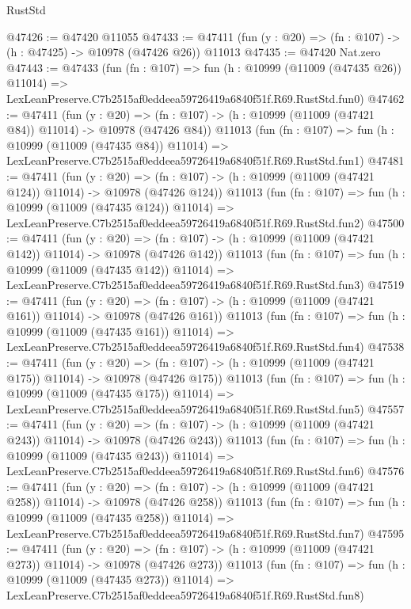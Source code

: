 \begin{lexlean}{RustStd}
\begin{coremodule}
@47426 := @47420 @11055
@47433 := @47411 (fun (y : @20) => (fn : @107) -> (h : @47425) -> @10978 (@47426 @26)) @11013
@47435 := @47420 Nat.zero
@47443 := @47433
    (fun (fn : @107) =>
    fun (h : @10999 (@11009 (@47435 @26)) @11014) =>
    LexLeanPreserve.C7b2515af0eddeea59726419a6840f51f.R69.RustStd.fun0)
@47462 := @47411
    (fun (y : @20) =>
    (fn : @107) -> (h : @10999 (@11009 (@47421 @84)) @11014) -> @10978 (@47426 @84))
    @11013
    (fun (fn : @107) =>
    fun (h : @10999 (@11009 (@47435 @84)) @11014) =>
    LexLeanPreserve.C7b2515af0eddeea59726419a6840f51f.R69.RustStd.fun1)
@47481 := @47411
    (fun (y : @20) =>
    (fn : @107) -> (h : @10999 (@11009 (@47421 @124)) @11014) -> @10978 (@47426 @124))
    @11013
    (fun (fn : @107) =>
    fun (h : @10999 (@11009 (@47435 @124)) @11014) =>
    LexLeanPreserve.C7b2515af0eddeea59726419a6840f51f.R69.RustStd.fun2)
@47500 := @47411
    (fun (y : @20) =>
    (fn : @107) -> (h : @10999 (@11009 (@47421 @142)) @11014) -> @10978 (@47426 @142))
    @11013
    (fun (fn : @107) =>
    fun (h : @10999 (@11009 (@47435 @142)) @11014) =>
    LexLeanPreserve.C7b2515af0eddeea59726419a6840f51f.R69.RustStd.fun3)
@47519 := @47411
    (fun (y : @20) =>
    (fn : @107) -> (h : @10999 (@11009 (@47421 @161)) @11014) -> @10978 (@47426 @161))
    @11013
    (fun (fn : @107) =>
    fun (h : @10999 (@11009 (@47435 @161)) @11014) =>
    LexLeanPreserve.C7b2515af0eddeea59726419a6840f51f.R69.RustStd.fun4)
@47538 := @47411
    (fun (y : @20) =>
    (fn : @107) -> (h : @10999 (@11009 (@47421 @175)) @11014) -> @10978 (@47426 @175))
    @11013
    (fun (fn : @107) =>
    fun (h : @10999 (@11009 (@47435 @175)) @11014) =>
    LexLeanPreserve.C7b2515af0eddeea59726419a6840f51f.R69.RustStd.fun5)
@47557 := @47411
    (fun (y : @20) =>
    (fn : @107) -> (h : @10999 (@11009 (@47421 @243)) @11014) -> @10978 (@47426 @243))
    @11013
    (fun (fn : @107) =>
    fun (h : @10999 (@11009 (@47435 @243)) @11014) =>
    LexLeanPreserve.C7b2515af0eddeea59726419a6840f51f.R69.RustStd.fun6)
@47576 := @47411
    (fun (y : @20) =>
    (fn : @107) -> (h : @10999 (@11009 (@47421 @258)) @11014) -> @10978 (@47426 @258))
    @11013
    (fun (fn : @107) =>
    fun (h : @10999 (@11009 (@47435 @258)) @11014) =>
    LexLeanPreserve.C7b2515af0eddeea59726419a6840f51f.R69.RustStd.fun7)
@47595 := @47411
    (fun (y : @20) =>
    (fn : @107) -> (h : @10999 (@11009 (@47421 @273)) @11014) -> @10978 (@47426 @273))
    @11013
    (fun (fn : @107) =>
    fun (h : @10999 (@11009 (@47435 @273)) @11014) =>
    LexLeanPreserve.C7b2515af0eddeea59726419a6840f51f.R69.RustStd.fun8)

\end{coremodule}
\end{lexlean}
